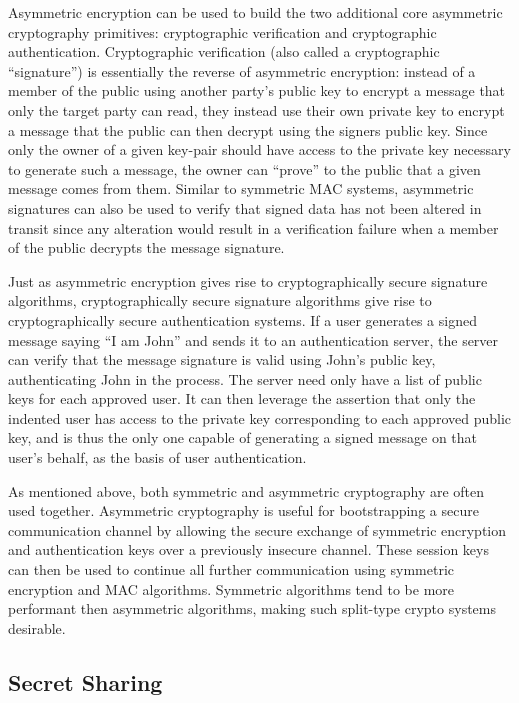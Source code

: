 Asymmetric encryption can be used to build the two additional core
asymmetric cryptography primitives: cryptographic verification and
cryptographic authentication. Cryptographic verification (also called
a cryptographic ``signature'') is essentially the reverse of
asymmetric encryption: instead of a member of the public using another
party's public key to encrypt a message that only the target party can
read, they instead use their own private key to encrypt a message that
the public can then decrypt using the signers public key. Since only
the owner of a given key-pair should have access to the private key
necessary to generate such a message, the owner can ``prove'' to the
public that a given message comes from them. Similar to symmetric MAC
systems, asymmetric signatures can also be used to verify that signed
data has not been altered in transit since any alteration would result
in a verification failure when a member of the public decrypts the
message signature.

Just as asymmetric encryption gives rise to cryptographically secure
signature algorithms, cryptographically secure signature algorithms
give rise to cryptographically secure authentication systems. If a
user generates a signed message saying ``I am John'' and sends it to
an authentication server, the server can verify that the message
signature is valid using John's public key, authenticating John in the
process. The server need only have a list of public keys for each
approved user. It can then leverage the assertion that only the
indented user has access to the private key corresponding to each
approved public key, and is thus the only one capable of generating a
signed message on that user's behalf, as the basis of user
authentication.

As mentioned above, both symmetric and asymmetric cryptography are
often used together. Asymmetric cryptography is useful for
bootstrapping a secure communication channel by allowing the secure
exchange of symmetric encryption and authentication keys over a
previously insecure channel. These session keys can then be used to
continue all further communication using symmetric encryption and MAC
algorithms. Symmetric algorithms tend to be more performant then
asymmetric algorithms, making such split-type crypto systems
desirable.

\subsection{Secret Sharing}

